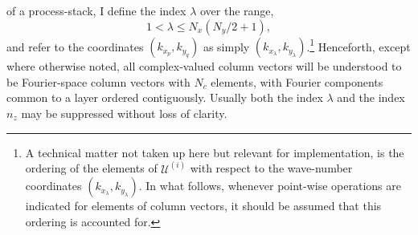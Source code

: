 \documentclass[12pt]{memoir}
\newcommand{\ufield}{\mathscr{U}}
\begin{document}
of a process-stack, I define the index $\lambda$ over the range,
%
\begin{equation}
1 <\lambda  \le N_x\left(N_y/2+1\right),
\end{equation}
and refer to the coordinates $(k_{x_p},k_{y_q})$ as simply
$(k_{x_\lambda}, k_{y_\lambda})$.\footnote{A technical matter
not taken up here but relevant for implementation, is the
ordering of the elements of $\ufield^{(i)}$ with respect to the
wave-number coordinates $(k_{x_\lambda},k_{y_\lambda})$.
In what follows, whenever point-wise operations are indicated
for elements of column vectors, it should be assumed that this
ordering is accounted for.}
%
Henceforth, except where otherwise noted, all complex-valued
column vectors will be understood to be Fourier-space column
vectors with $N_c$ elements, with Fourier components common to
a layer ordered contiguously. Usually both the index $\lambda$
and the index $n_z$ may be suppressed without loss of clarity.
%
\par
%
\end{document}
